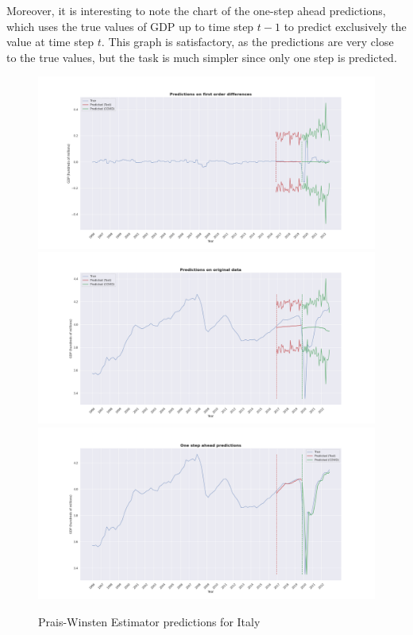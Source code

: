 Moreover, it is interesting to note the chart of the one-step ahead predictions, which uses the true values of GDP up to time step $t-1$ to predict exclusively the value at time step $t$. This graph is satisfactory, as the predictions are very close to the true values, but the task is much simpler since only one step is predicted.
\begin{figure}[H]
  \includegraphics[width=.9\linewidth]{imgs/italy_pred_diff.png}
  \includegraphics[width=.9\linewidth]{imgs/italy_reg_predictions.png}
  \includegraphics[width=.9\linewidth]{imgs/italy_pred_one_ahead.png}
  \caption{Prais-Winsten Estimator predictions for Italy}
  \label{fig:italy_pw_pred}
\end{figure}

